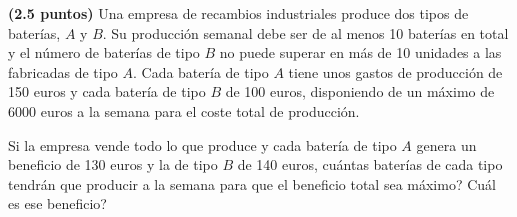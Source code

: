 
\textbf{(2.5 puntos)} Una empresa de recambios industriales produce dos tipos
de baterías, $A$ y $B$. Su producción semanal debe ser de al menos 10 baterías
en total y el número de baterías de tipo $B$ no puede superar en más de
10 unidades a las fabricadas de tipo $A$. Cada batería de tipo $A$ tiene unos
gastos de producción de 150 euros y cada batería de tipo $B$ de 100 euros,
disponiendo de un máximo de 6000 euros a la semana para el coste total de
producción.

Si la empresa vende todo lo que produce y cada batería de tipo $A$ genera un
beneficio de 130 euros y la de tipo $B$ de 140 euros,
\textquestiondown{}cuántas baterías de cada tipo tendrán que producir a la
semana para que el beneficio total sea máximo? \textquestiondown{}Cuál es ese
beneficio?
